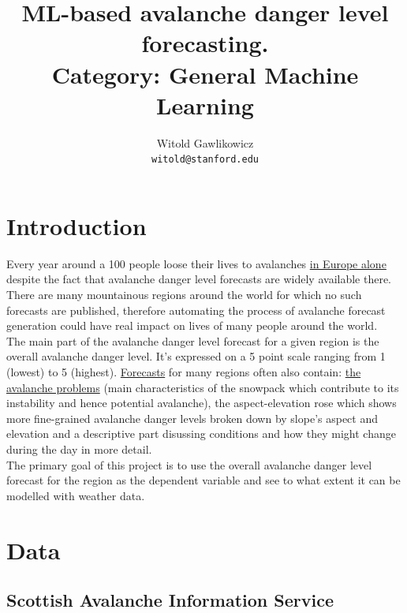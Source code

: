 \documentclass{article}
\title{ML-based avalanche danger level forecasting. \\ Category: General Machine Learning}
\author{
  Witold Gawlikowicz \\
  \texttt{witold@stanford.edu}
}
\newcommand{\sais}{Scottish Avalanche Information Service}
\begin{document}
\maketitle

\graphicspath{{assets/figures/}}





\section{Introduction}

	Every year around a 100 people loose their lives to avalanches \href{https://www.avalanches.org/fatalities/}{in Europe alone} despite the fact that avalanche danger level forecasts are widely available there. There are many mountainous regions around the world for which no such forecasts are published, therefore automating the process of avalanche forecast generation could have real impact on lives of many people around the world. \\

	The main part of the avalanche danger level forecast for a given region is the overall avalanche danger level. It's expressed on a 5 point scale ranging from 1 (lowest) to 5 (highest).	\href{https://www.shastaavalanche.org/page/how-read-advisory}{Forecasts} for many regions often also contain: \href{https://avalanche.state.co.us/forecasts/tutorial/avalanche-problems}{the avalanche problems} (main characteristics of the snowpack which contribute to its instability and hence potential avalanche), the aspect-elevation rose which shows more fine-grained avalanche danger levels broken down by slope's aspect and elevation and a descriptive part disussing conditions and how they might change during the day in more detail. \\
	The primary goal of this project is to use the overall avalanche danger level forecast for the region as the dependent variable and see to what extent it can be modelled with weather data.
	
\section{Data}


\subsection{\sais}\label{sec:data_sais}
\end{document}
